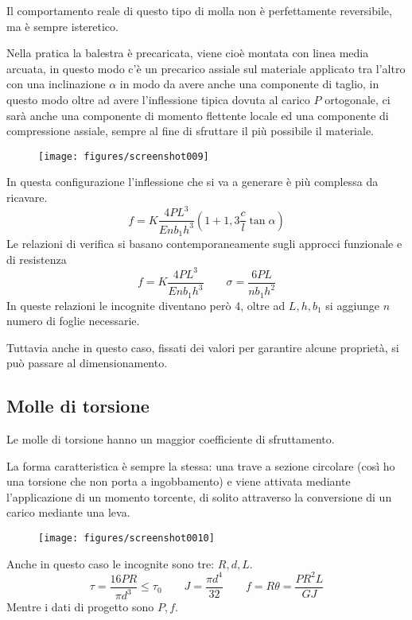 \documentclass[a4paper, 15pt]{article}
\begin{document}
\begin{adjustwidth}{2in}{}
Il comportamento reale di questo tipo di molla non è perfettamente reversibile, ma è sempre isteretico. 

Nella pratica la balestra è precaricata, viene cioè montata con  linea media arcuata, in questo modo c'è un precarico assiale sul materiale applicato tra l'altro con una inclinazione $\alpha$ in modo da avere anche una componente di taglio, in questo modo oltre ad avere l'inflessione tipica dovuta al carico $P$ ortogonale, ci sarà anche una componente di momento flettente locale ed una componente di compressione assiale, sempre al fine di sfruttare il più possibile il materiale. 
\begin{figure}[H]
	\centering
	\texttt{[image: figures/screenshot009]}
	\label{fig:screenshot009}
\end{figure}
In questa configurazione l'inflessione che si va a generare è più complessa da ricavare. 
\[f = K\dfrac{4PL^3}{Enb_1h^3}\left(1+1,3\dfrac{c}{l}\tan\alpha\right)\]
Le relazioni di verifica si basano contemporaneamente sugli approcci funzionale e di resistenza 
\[f = K\dfrac{4PL^3}{Enb_1h^3} \qquad \sigma = \dfrac{6PL}{nb_1h^2}\]
In queste relazioni le incognite diventano però 4, oltre ad $L, h, b_1$ si aggiunge $n$ numero di foglie necessarie. 

Tuttavia anche in questo caso, fissati dei valori per garantire alcune proprietà, si può passare al dimensionamento. 
\end{adjustwidth}
\subsection{Molle di torsione}
\begin{adjustwidth}{2in}{}	
Le molle di torsione hanno un maggior coefficiente di sfruttamento.

La forma caratteristica è sempre la stessa: una trave a sezione circolare (così ho una torsione che non porta a ingobbamento) e viene attivata mediante l'applicazione di un momento torcente, di solito attraverso la conversione di un carico mediante una leva. 
\begin{figure}[H]
	\centering
	\texttt{[image: figures/screenshot0010]}
	\label{fig:screenshot0010}
\end{figure}
Anche in questo caso le incognite sono tre: $R, d, L$. 
\[\tau = \dfrac{16PR}{\pi d^3}\leq\tau_0 \qquad J = \dfrac{\pi d^4}{32} \qquad f = R\theta = \dfrac{PR^2L}{GJ}\]
Mentre i dati di progetto sono $P, f$. 
\end{adjustwidth}
\newpage
\end{document}

